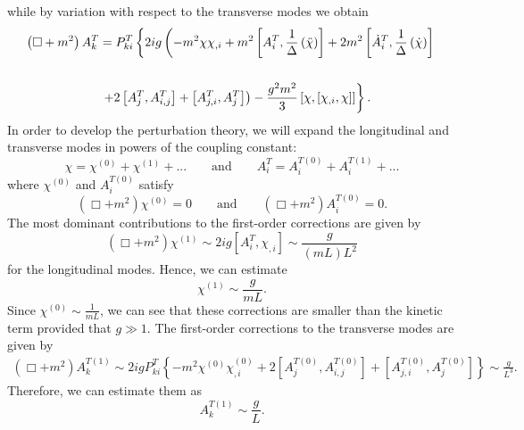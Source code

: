 \documentclass{article}
\begin{document}
while by variation with respect to the transverse modes we obtain 
\begin{equation}
    \begin{split}
         \left(\Box+m^2\right)A_k^T&=P_{ki}^T\left\{2ig\left(-m^2\chi\chi_{,i}+m^2\left[A_i^T,\frac{1}{\Delta}\left(\Ddot{\chi}\right)\right]+2m^2\left[\dot{A}_i^T,\frac{1}{\Delta}\left(\dot{\chi}\right)\right]\right.\right.\\\\
         &\left.\left.+2\left[A_j^T,A_{i,j}^T\right]+\left[A_{j,i}^T,A_j^T\right]\right)-\frac{g^2m^2}{3}\left[\chi,\left[\chi_{,i},\chi\right]\right]\right\}.
    \end{split}
\end{equation}
In order to develop the perturbation theory, we will expand the longitudinal and transverse modes in powers of the coupling constant: 
\begin{equation}
    \chi=\chi^{(0)}+\chi^{(1)}+...\qquad\text{and}\qquad A_i^T=A_i^{T(0)}+A_i^{T(1)}+...
\end{equation}
where $\chi^{(0)}$ and $A_i^{T(0)}$ satisfy 
\begin{equation}
     \left(\Box+m^2\right)\chi^{(0)}=0\qquad\text{and}\qquad \left(\Box+m^2\right)A_i^{T(0)}=0.
\end{equation}
The most dominant contributions to the first-order corrections are given by 
\begin{equation}
    \left(\Box+m^2\right)\chi^{(1)}\sim2ig\left[A_i^T,\chi_{,i}\right]\sim\frac{g}{\left(mL\right)L^2}
\end{equation}
for the longitudinal modes. Hence, we can estimate
\begin{equation}
    \chi^{(1)}\sim\frac{g}{mL}.
\end{equation}
Since $\chi^{(0)}\sim\frac{1}{mL}$, we can see that these corrections are smaller than the kinetic term provided that $g\gg 1$. The first-order corrections to the transverse modes are given by 
\begin{equation}
    \begin{split}
         \left(\Box+m^2\right)A_k^{T(1)}\sim2igP_{ki}^T\left\{-m^2\chi^{(0)}\chi^{(0)}_{,i}+2\left[A_j^{T(0)},A_{i,j}^{T(0)}\right]+\left[A_{j,i}^{T(0)},A_j^{T(0)}\right]\right\}\sim\frac{g}{L^3}.
    \end{split}
\end{equation}
Therefore, we can estimate them as
\begin{equation}
    A_k^{T(1)}\sim\frac{g}{L}.
\end{equation}
\end{document}
